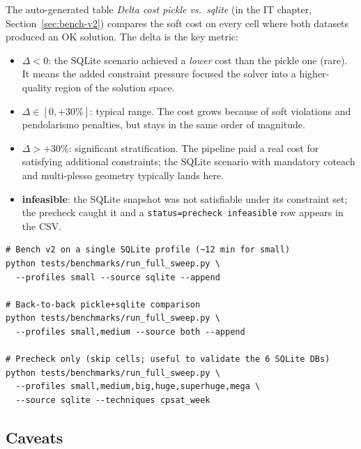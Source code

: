 The auto-generated table \emph{Delta cost pickle vs.\ sqlite}
(in the IT chapter, Section~\ref{sec:bench-v2}) compares the
soft cost on every cell where both datasets produced an OK
solution. The delta is the key metric:

\begin{itemize}
\item \textbf{$\Delta < 0$}: the SQLite scenario achieved a
  \emph{lower} cost than the pickle one (rare). It means the
  added constraint pressure focused the solver into a higher-
  quality region of the solution space.
\item \textbf{$\Delta \in [0, +30\%]$}: typical range. The cost
  grows because of soft violations and pendolarismo penalties,
  but stays in the same order of magnitude.
\item \textbf{$\Delta > +30\%$}: significant stratification.
  The pipeline paid a real cost for satisfying additional
  constraints; the SQLite scenario with mandatory coteach and
  multi-plesso geometry typically lands here.
\item \textbf{infeasible}: the SQLite snapshot was not
  satisfiable under its constraint set; the precheck caught it
  and a \texttt{status=precheck infeasible} row appears in the
  CSV.
\end{itemize}

\begin{esempiobox}[title=Try it now]
\begin{lstlisting}[style=shell]
# Bench v2 on a single SQLite profile (~12 min for small)
python tests/benchmarks/run_full_sweep.py \
  --profiles small --source sqlite --append

# Back-to-back pickle+sqlite comparison
python tests/benchmarks/run_full_sweep.py \
  --profiles small,medium --source both --append

# Precheck only (skip cells; useful to validate the 6 SQLite DBs)
python tests/benchmarks/run_full_sweep.py \
  --profiles small,medium,big,huge,superhuge,mega \
  --source sqlite --techniques cpsat_week
\end{lstlisting}
\end{esempiobox}

\subsection{Caveats}

